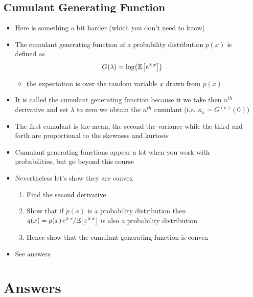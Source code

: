 \documentclass[11pt]{article}
\newcommand{\av}[2][]{\mathbb{E}_{#1\!}\left[ #2 \right]}
\newcommand{\logg}[1]{\log\!\left( #1 \right)}
\newcommand{\e}[1]{{\rm e}^{#1}}
\begin{document}
\subsection{Cumulant Generating Function}
\label{sec:orge826acd}
\begin{itemize}
\item Here is something a bit harder (which you don't need to know)
\item The cumulant generating function of a probability distribution
\(p(x)\) is defined as
$$ G(\lambda) = \logg{\av{\e{\lambda\,x}}} $$
\begin{itemize}
\item the expectation is over the random variable \(x\) drawn from \(p(x)\)
\end{itemize}
\item It is called the cumulant generating function because it we take
then \(n^{th}\) derivative and set \(\lambda\) to zero we obtain the
\(n^{th}\) cumulant (i.e. \(\kappa_n = G^{(n)}(0)\))
\item The first cumulant is the mean, the second the variance while the
third and forth are proportional to the skewness and kurtosis
\item Cumulant generating functions appear a lot when you work with
probabilities, but go beyond this course
\item Nevertheless let's show they are convex
\begin{enumerate}
\item Find the second derivative
\item Show that if \(p(x)\) is a probability distribution then \(q(x) =
        p(x)\,\e{\lambda\,x}/\av{\e{\lambda\,x}}\) is also a
probability distribution
\item Hence show that the cumulant generating function is convex
\end{enumerate}
\item See answers
\end{itemize}


\section{Answers}
\label{sec:org7d3d70b}
\end{document}
